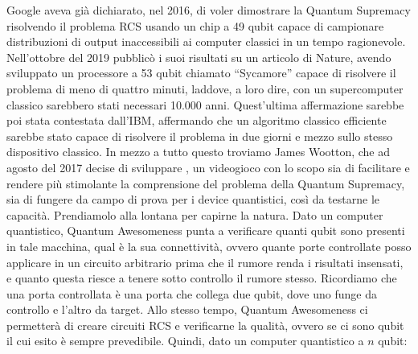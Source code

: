 \documentclass{book}
\theoremstyle{definition}
\theoremstyle{definition}
\theoremstyle{definition}
\theoremstyle{plain}
\theoremstyle{plain}
\theoremstyle{plain}
\theoremstyle{plain}
\begin{document}
Google aveva già dichiarato, nel 2016, di voler dimostrare la Quantum Supremacy risolvendo il problema RCS usando un chip a 49 qubit capace di campionare distribuzioni di output inaccessibili ai computer classici in un tempo ragionevole. Nell'ottobre del 2019 pubblicò i suoi risultati su un articolo di Nature\cite{nature_quantum_supremacy_google}, avendo sviluppato un processore a 53 qubit chiamato ``Sycamore'' capace di risolvere il problema di meno di quattro minuti, laddove, a loro dire, con un supercomputer classico sarebbero stati necessari 10.000 anni. Quest'ultima affermazione sarebbe poi stata contestata dall'IBM, affermando che un algoritmo classico efficiente sarebbe stato capace di risolvere il problema in due giorni e mezzo sullo stesso dispositivo classico.
In mezzo a tutto questo troviamo James Wootton, che ad agosto del 2017 decise di sviluppare \cite{wootton_puzzle}\cite{wootton_puzzle_2}, un videogioco con lo scopo sia di facilitare e rendere più stimolante la comprensione del problema della Quantum Supremacy, sia di fungere da campo di prova per i device quantistici, così da testarne le capacità. Prendiamolo alla lontana per capirne la natura.
Dato un computer quantistico, Quantum Awesomeness punta a verificare quanti qubit sono presenti in tale macchina, qual è la sua connettività, ovvero quante porte controllate posso applicare in un circuito arbitrario prima che il rumore renda i risultati insensati, e quanto questa riesce a tenere sotto controllo il rumore stesso. Ricordiamo che una porta controllata è una porta che collega due qubit, dove uno funge da controllo e l'altro da target. Allo stesso tempo, Quantum Awesomeness ci permetterà di creare circuiti RCS e verificarne la qualità, ovvero se ci sono qubit il cui esito è sempre prevedibile. Quindi, dato un computer quantistico a $n$ qubit:
\end{document}
